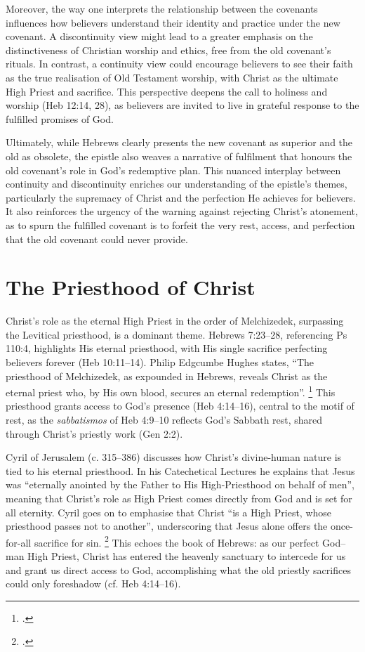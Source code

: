 \documentclass[12pt]{article}
\begin{document}
Moreover, the way one interprets the relationship between the covenants
influences how believers understand their identity and practice under the new
covenant. A discontinuity view might lead to a greater emphasis on the
distinctiveness of Christian worship and ethics, free from the old covenant’s
rituals. In contrast, a continuity view could encourage believers to see their
faith as the true realisation of Old Testament worship, with Christ as the
ultimate High Priest and sacrifice. This perspective deepens the call to
holiness and worship (Heb 12:14, 28), as believers are invited to live in
grateful response to the fulfilled promises of God.

Ultimately, while Hebrews clearly presents the new covenant as superior and the
old as obsolete, the epistle also weaves a narrative of fulfilment that honours
the old covenant’s role in God’s redemptive plan. This nuanced interplay between
continuity and discontinuity enriches our understanding of the epistle’s themes,
particularly the supremacy of Christ and the perfection He achieves for
believers. It also reinforces the urgency of the warning against rejecting
Christ’s atonement, as to spurn the fulfilled covenant is to forfeit the very
rest, access, and perfection that the old covenant could never provide.

\section{The Priesthood of Christ}
Christ’s role as the eternal High Priest in the order of Melchizedek, surpassing
the Levitical priesthood, is a dominant theme. Hebrews 7:23--28, referencing Ps
110:4, highlights His eternal priesthood, with His single sacrifice perfecting
believers forever (Heb 10:11--14). Philip Edgcumbe Hughes states, ``The
priesthood of Melchizedek, as expounded in Hebrews, reveals Christ as the
eternal priest who, by His own blood, secures an eternal redemption''.
\footcite[258]{Hughes1977}
This priesthood grants access to God’s presence (Heb 4:14--16),
central to the motif of rest, as the \textit{sabbatismos} of Heb 4:9--10
reflects God’s Sabbath rest, shared through Christ’s priestly work (Gen 2:2).

Cyril of Jerusalem (c. 315–386) discusses how Christ’s divine-human nature is
tied to his eternal priesthood. In his Catechetical Lectures he explains that
Jesus was ``eternally anointed by the Father to His High-Priesthood on behalf of
men'', meaning that Christ’s role as High Priest comes directly from God and is
set for all eternity. Cyril goes on to emphasise that Christ ``is a High Priest,
whose priesthood passes not to another'', underscoring that Jesus alone offers
the once-for-all sacrifice for sin. \footcite[Lecture 12]{Cyril1894}
This echoes the book of Hebrews: as our perfect God–man High Priest, Christ has
entered the heavenly sanctuary to intercede for us and grant us direct access to
God, accomplishing what the old priestly sacrifices could only foreshadow (cf.
Heb 4:14–16).
\end{document}
